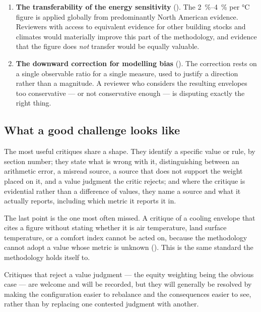 \begin{enumerate}
  \item \textbf{The transferability of the energy sensitivity}
  (). The \SIrange{2}{4}{\percent} per \si{\degreeCelsius}
  figure is applied globally from predominantly North American evidence.
  Reviewers with access to equivalent evidence for other building stocks and
  climates would materially improve this part of the methodology, and evidence
  that the figure does \emph{not} transfer would be equally valuable.

  \item \textbf{The downward correction for modelling bias}
  (). The correction rests on a single observable
  ratio for a single measure, used to justify a direction rather than a
  magnitude. A reviewer who considers the resulting envelopes too conservative
  --- or not conservative enough --- is disputing exactly the right thing.
\end{enumerate}

\subsection{What a good challenge looks like}

The most useful critiques share a shape. They identify a specific value or
rule, by section number; they state what is wrong with it, distinguishing
between an arithmetic error, a misread source, a source that does not support
the weight placed on it, and a value judgment the critic rejects; and where the
critique is evidential rather than a difference of values, they name a source
and what it actually reports, including which metric it reports it in.

The last point is the one most often missed. A critique of a cooling envelope
that cites a figure without stating whether it is air temperature, land surface
temperature, or a comfort index cannot be acted on, because the methodology
cannot adopt a value whose metric is unknown (). This is the
same standard the methodology holds itself to.

Critiques that reject a value judgment --- the equity weighting being the
obvious case --- are welcome and will be recorded, but they will generally be
resolved by making the configuration easier to rebalance and the consequences
easier to see, rather than by replacing one contested judgment with another.
